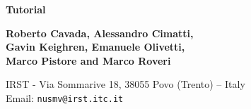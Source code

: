\begin{titlepage}
\begin{center}
  \begin{Huge}
  {\bf \NuSMV Tutorial}\\
  \end{Huge}
  \vspace{0.5cm}
  \vspace{4.0cm}

  \begin{Large}
  {\bf Roberto Cavada, Alessandro Cimatti,\\ 
  Gavin Keighren, Emanuele Olivetti,\\
  Marco Pistore and Marco Roveri}
  \end{Large}

  \vspace{1cm}
  {IRST - Via Sommarive 18, 38055 Povo (Trento) -- Italy}\\

  \vspace{1cm}
  Email: {\tt nusmv@irst.itc.it}\\
  \vspace{4.0cm}
\end{center}
\vspace{1in}
\end{titlepage}
